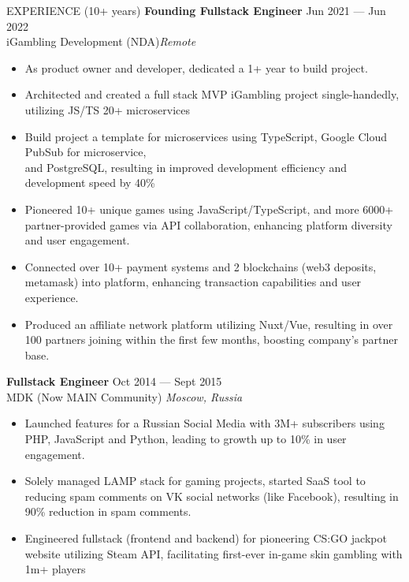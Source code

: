 \documentclass{template} %
\begin{document}
\begin{rSection}{EXPERIENCE (10+ years)}
\textbf{Founding Fullstack Engineer} \hfill Jun 2021 --- Jun 2022\\
iGambling Development (NDA)\hfill \textit{Remote}
 \begin{itemize}
    \itemsep -3pt {} 
     \item As product owner and developer, dedicated a 1+ year to build project.
     \item Architected and created a full stack MVP iGambling project single-handedly, utilizing JS/TS 20+ microservices
     \item Build project a template for microservices using TypeScript, Google Cloud PubSub for microservice,\\and PostgreSQL, resulting in improved development efficiency and development speed by 40\%
     \item Pioneered 10+ unique games using JavaScript/TypeScript, and more 6000+ partner-provided games via API collaboration, enhancing platform diversity and user engagement.
     \item Connected over 10+ payment systems and 2 blockchains (web3 deposits, metamask) into platform, enhancing transaction capabilities and user experience.
     \item Produced an affiliate network platform utilizing Nuxt/Vue, resulting in over 100 partners joining within the first few months, boosting company’s partner base.
 \end{itemize}
 \textbf{Fullstack Engineer} \hfill Oct 2014 --- Sept 2015\\
MDK (Now MAIN Community) \hfill \textit{Moscow, Russia}
 \begin{itemize}
    \itemsep -3pt {} 
     \item Launched features for a Russian Social Media with 3M+ subscribers using PHP, JavaScript and Python, leading to growth up to 10\% in user engagement.
     \item Solely managed LAMP stack for gaming projects, started SaaS tool to reducing spam comments on VK social networks (like Facebook), resulting in 90\% reduction in spam comments.
     \item Engineered fullstack (frontend and backend) for pioneering CS:GO jackpot website utilizing Steam API, facilitating first-ever in-game skin gambling with 1m+ players
 \end{itemize}

\end{rSection} 

\end{document}

